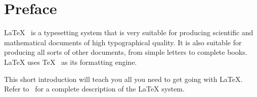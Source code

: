 %
%
%
%



\chapter{Preface}

\LaTeX{}~\cite{manual} is a typesetting system that is very
suitable for producing scientific and mathematical documents of high
typographical quality. It is also suitable for producing all
sorts of other documents, from simple letters to complete books.
\LaTeX{} uses \TeX{}~\cite{texbook} as its formatting engine.

This short introduction will teach you all you need to get going with \LaTeX.
Refer to~\cite{manual,companion} for a complete description of the \LaTeX{}
system.

